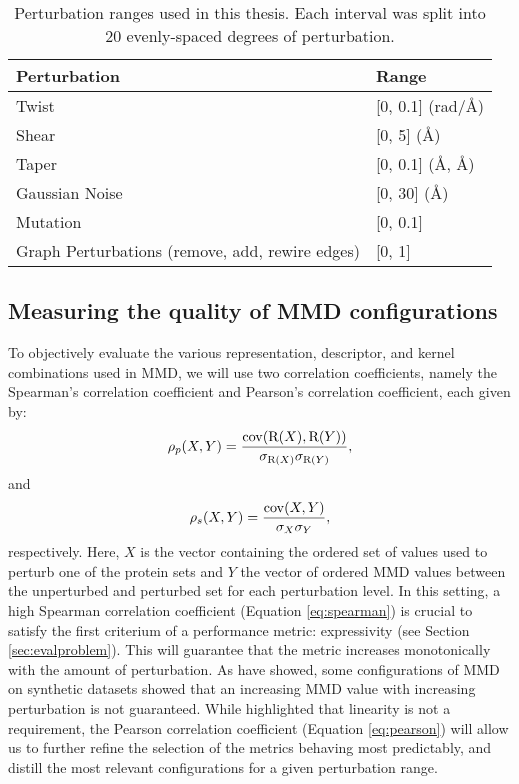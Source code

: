 \begin{table}
  \centering
  \begin{tabular}{>{\raggedright\arraybackslash}p{4.8cm}l}
    \toprule
    \textbf{Perturbation} & \textbf{Range} \\
    \midrule
    Twist & [0, 0.1] (rad/\si{\angstrom})\\
    Shear & [0, 5] (\si{\angstrom}) \\
    Taper & [0, 0.1] (\si{\angstrom}, \si{\angstrom}) \\ %
    Gaussian Noise & [0, 30] (\si{\angstrom}) \\
    Mutation & [0, 0.1]\\
    Graph Perturbations (remove, add, rewire edges) & [0, 1]\\
    \bottomrule
  \end{tabular}
  \caption{Perturbation ranges used in this thesis. Each interval was split into
20 evenly-spaced degrees of perturbation.}
  \label{tab:perturbation_ranges}
\end{table}



\subsection{Measuring the quality of MMD configurations}

To objectively evaluate the various representation, descriptor, and kernel
combinations used in MMD, we will use two correlation coefficients, namely the
Spearman's correlation coefficient and Pearson's correlation coefficient, each
given by:
\begin{equation}
  \label{eq:spearman} \rho_p(X,Y) = {\mathrm{cov}(\mathrm{R}(X), \mathrm{R}(Y)) \over
\sigma_{\mathrm{R}(X)}\sigma_{\mathrm{R}(Y)}},
\end{equation} and
\begin{equation}
  \label{eq:pearson} \rho_s(X,Y) = {\mathrm{cov}(X, Y)\over \sigma_X\sigma_Y},
\end{equation}
respectively. Here, $X$ is the vector containing the ordered set of values used
to perturb one of the protein sets and $Y$ the vector of ordered MMD values
between the unperturbed and perturbed set for each perturbation level. In this
setting, a high Spearman correlation coefficient (Equation \ref{eq:spearman}) is
crucial to satisfy the first criterium of a performance metric: expressivity
(see Section \ref{sec:evalproblem}). This will guarantee that the metric
increases monotonically with the amount of perturbation. As
\cite{o2021evaluation} have showed, some configurations of MMD on synthetic
datasets showed that an increasing MMD value with increasing perturbation is not
guaranteed. While \cite{thompson2022evaluation} highlighted that linearity is
not a requirement, the Pearson correlation coefficient (Equation
\ref{eq:pearson}) will allow us to further refine the selection of the metrics
behaving most predictably, and distill the most relevant configurations for a
given perturbation range.

